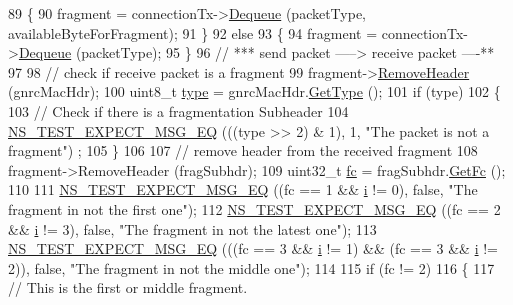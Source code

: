 \begin{DoxyCode}
89         \{
90           fragment = connectionTx->\hyperlink{classns3_1_1WimaxConnection_a54b822cae000f9acd50c63f59219ab6a}{Dequeue} (packetType, availableByteForFragment);
91         \}
92       \textcolor{keywordflow}{else}
93         \{
94           fragment = connectionTx->\hyperlink{classns3_1_1WimaxConnection_a54b822cae000f9acd50c63f59219ab6a}{Dequeue} (packetType);
95         \}
96 \textcolor{comment}{// *** send packet -----> receive packet ----**}
97 
98       \textcolor{comment}{// check if receive packet is a fragment}
99       fragment->\hyperlink{classns3_1_1Packet_a0961eccf975d75f902d40956c93ba63e}{RemoveHeader} (gnrcMacHdr);
100       uint8\_t \hyperlink{visualizer-ideas_8txt_add98db9e15e2a58cf2b57623e7aa893a}{type} = gnrcMacHdr.\hyperlink{classns3_1_1GenericMacHeader_aa0145e7dc78803c1193edb55307bb1a4}{GetType} ();
101       \textcolor{keywordflow}{if} (type)
102         \{
103           \textcolor{comment}{// Check if there is a fragmentation Subheader}
104           \hyperlink{group__testing_ga7304ba46a28d8cf08dfdfd6499cf7068}{NS\_TEST\_EXPECT\_MSG\_EQ} (((type >> 2) & 1), 1, \textcolor{stringliteral}{"The packet is not a fragment"})
      ;
105         \}
106 
107       \textcolor{comment}{// remove header from the received fragment}
108       fragment->RemoveHeader (fragSubhdr);
109       uint32\_t \hyperlink{generate__test__data__lte__spectrum__model_8m_a72d54db2b27ce046aab6e6a414c407e9}{fc} = fragSubhdr.\hyperlink{classns3_1_1FragmentationSubheader_ad796f851f0da640a5e732be1e28dc15d}{GetFc} ();
110 
111       \hyperlink{group__testing_ga7304ba46a28d8cf08dfdfd6499cf7068}{NS\_TEST\_EXPECT\_MSG\_EQ} ((fc == 1 && \hyperlink{bernuolliDistribution_8m_a6f6ccfcf58b31cb6412107d9d5281426}{i} != 0), \textcolor{keyword}{false}, \textcolor{stringliteral}{"The fragment in not the
       first one"});
112       \hyperlink{group__testing_ga7304ba46a28d8cf08dfdfd6499cf7068}{NS\_TEST\_EXPECT\_MSG\_EQ} ((fc == 2 && \hyperlink{bernuolliDistribution_8m_a6f6ccfcf58b31cb6412107d9d5281426}{i} != 3), \textcolor{keyword}{false}, \textcolor{stringliteral}{"The fragment in not the
       latest one"});
113       \hyperlink{group__testing_ga7304ba46a28d8cf08dfdfd6499cf7068}{NS\_TEST\_EXPECT\_MSG\_EQ} (((fc == 3 && \hyperlink{bernuolliDistribution_8m_a6f6ccfcf58b31cb6412107d9d5281426}{i} != 1) && (fc == 3 && 
      \hyperlink{bernuolliDistribution_8m_a6f6ccfcf58b31cb6412107d9d5281426}{i} != 2)), \textcolor{keyword}{false}, \textcolor{stringliteral}{"The fragment in not the middle one"});
114 
115       \textcolor{keywordflow}{if} (fc != 2)
116         \{
117           \textcolor{comment}{// This is the first or middle fragment.}

\end{DoxyCode}
